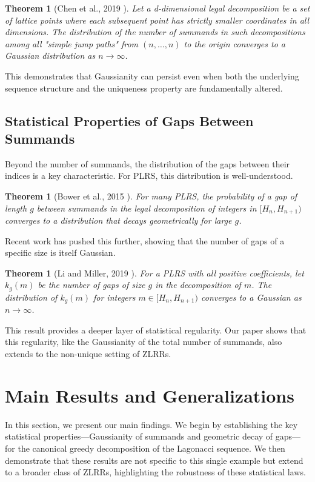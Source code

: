 \documentclass[11pt]{amsart}
\theoremstyle{plain}
\numberwithin{equation}{section} %
\newtheorem{theorem}[thm]{Theorem}
\numberwithin{table}{section} %
\numberwithin{figure}{section}
\begin{document}
	\begin{theorem}[Chen et al., 2019 \cite{ChenEtAl2019Lattice}]
		Let a d-dimensional legal decomposition be a set of lattice points where each subsequent point has strictly smaller coordinates in all dimensions. The distribution of the number of summands in such decompositions among all "simple jump paths" from $(n, \dots, n)$ to the origin converges to a Gaussian distribution as $n \to \infty$.
	\end{theorem}
	This demonstrates that Gaussianity can persist even when both the underlying sequence structure and the uniqueness property are fundamentally altered.
	
	\subsection{Statistical Properties of Gaps Between Summands}
	Beyond the number of summands, the distribution of the gaps between their indices is a key characteristic. For PLRS, this distribution is well-understood.
	
	\begin{theorem}[Bower et al., 2015 \cite{bower2015gaps}]
		For many PLRS, the probability of a gap of length $g$ between summands in the legal decomposition of integers in $[H_n, H_{n+1})$ converges to a distribution that decays geometrically for large $g$.
	\end{theorem}
	
	Recent work has pushed this further, showing that the number of gaps of a specific size is itself Gaussian.
	
	\begin{theorem}[Li and Miller, 2019 \cite{LiMiller2019Gaps}]
		For a PLRS with all positive coefficients, let $k_g(m)$ be the number of gaps of size $g$ in the decomposition of $m$. The distribution of $k_g(m)$ for integers $m \in [H_n, H_{n+1})$ converges to a Gaussian as $n \to \infty$.
	\end{theorem}
	
	This result provides a deeper layer of statistical regularity. Our paper shows that this regularity, like the Gaussianity of the total number of summands, also extends to the non-unique setting of ZLRRs.
	
	\section{Main Results and Generalizations}
	
	In this section, we present our main findings. We begin by establishing the key statistical properties—Gaussianity of summands and geometric decay of gaps—for the canonical greedy decomposition of the Lagonacci sequence. We then demonstrate that these results are not specific to this single example but extend to a broader class of ZLRRs, highlighting the robustness of these statistical laws.
	
\end{document}
